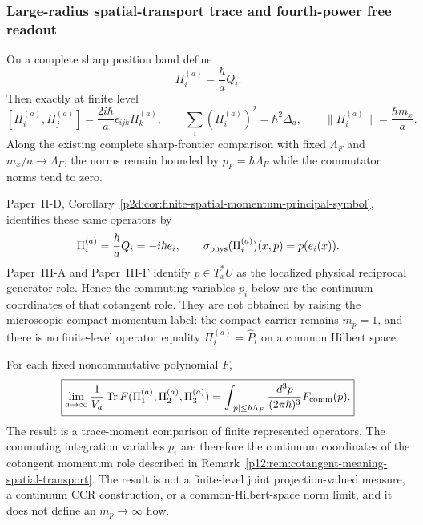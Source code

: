 \documentclass[12pt,a4paper]{article}
\begin{document}
\subsubsection{Large-radius spatial-transport trace and fourth-power free readout}
\label{p12:sec:v180-spatial-transport-trace-limit}

\begin{proposition}
\label{p12:prop:scaled-spatial-transport-commutators}
On a complete sharp position band define
\[
 \Pi_i^{(a)}=\frac{\hbar}{a}Q_i.
\]
Then exactly at finite level
\[
 [\Pi_i^{(a)},\Pi_j^{(a)}]
 =\frac{2i\hbar}{a}\epsilon_{ijk}\Pi_k^{(a)},\qquad
 \sum_i(\Pi_i^{(a)})^2=\hbar^2\Delta_a,
 \qquad \|\Pi_i^{(a)}\|=\frac{\hbar m_x}{a}.
\]
Along the existing complete sharp-frontier comparison with fixed
$\Lambda_F$ and $m_x/a\to\Lambda_F$, the norms remain bounded by
$p_F=\hbar\Lambda_F$ while the commutator norms tend to zero.
\end{proposition}

\begin{remark}
\label{p12:rem:cotangent-meaning-spatial-transport}
Paper~II-D,
Corollary~\ref{p2d:cor:finite-spatial-momentum-principal-symbol}, identifies
these same operators by
\[
 \Pi_i^{(a)}=\frac{\hbar}{a}Q_i=-i\hbar e_i,
 \qquad
 \sigma_{\rm phys}(\Pi_i^{(a)})(x,p)=p(e_i(x)).
\]
Paper~III-A and Paper~III-F identify $p\in T_x^*U$ as the localized physical
reciprocal generator role.  Hence the commuting variables $p_i$ below are the
continuum coordinates of that cotangent role.  They are not obtained by
raising the microscopic compact momentum label: the compact carrier remains
$m_p=1$, and there is no finite-level operator equality
$\Pi_i^{(a)}=\widehat P_i$ on a common Hilbert space.
\end{remark}

\begin{theorem}
\label{p12:thm:spatial-transport-momentum-ball-trace}
For each fixed noncommutative polynomial $F$,
\[
 \boxed{
 \lim_{a\to\infty}\frac1{V_a}\operatorname{Tr}
 F(\Pi_1^{(a)},\Pi_2^{(a)},\Pi_3^{(a)})
 =\int_{|p|\le\hbar\Lambda_F}
 \frac{d^3p}{(2\pi\hbar)^3}F_{\rm comm}(p).}
\]
The result is a trace-moment comparison of finite represented operators.  The
commuting integration variables $p_i$ are therefore the continuum coordinates
of the cotangent momentum role described in
Remark~\ref{p12:rem:cotangent-meaning-spatial-transport}.  The result is not a
finite-level joint projection-valued measure, a continuum CCR construction,
or a common-Hilbert-space norm limit, and it does not define an
$m_p\to\infty$ flow.
\end{theorem}
\end{document}
